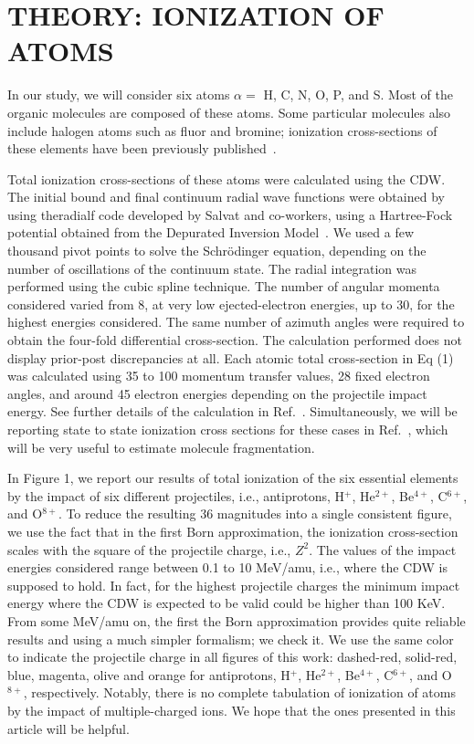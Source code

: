 \documentclass[preprint,showpacs,pra]{revtex4-1}
\begin{document}
\section{THEORY: IONIZATION OF ATOMS}

In our study, we will consider six atoms $\alpha=$ H, C, N, O, P, and S. 
Most of the organic molecules are composed of these atoms. Some 
particular molecules also include halogen atoms such as fluor and 
bromine; ionization cross-sections of these elements have been 
previously published~\cite{miraglia2008,miraglia2009}.

Total ionization cross-sections of these atoms were calculated using 
the CDW. The initial bound and final continuum radial wave functions 
were obtained by using the{\sc radialf} code developed by Salvat and 
co-workers, using a Hartree-Fock potential obtained from the 
Depurated Inversion Model~\cite{mendez2016,mendez2018}. 
We used a few thousand pivot points to solve the Schr\"{o}dinger 
equation, depending on the number of oscillations of the continuum 
state. The radial integration was performed using the 
cubic spline technique. The number of angular momenta considered 
varied from 8, at very low ejected-electron energies, up to 30, 
for the highest energies considered. The same number of azimuth 
angles were required to obtain the four-fold differential 
cross-section. The calculation performed does not display prior-post 
discrepancies at all. Each atomic total cross-section in Eq (1) was 
calculated using 35 to 100 momentum transfer values, 28 fixed 
electron angles, and around 45 electron energies depending on the 
projectile impact energy. See further details of the calculation 
in Ref.~\cite{montanari2017}. Simultaneously, we will be reporting 
state to state ionization cross sections for these cases in 
Ref.~\cite{miraglia2019}, which will be very useful to estimate 
molecule fragmentation.

In Figure 1, we report our results of total ionization of the six 
essential elements by the impact of six different projectiles, i.e., 
antiprotons, H$^{+}$, He$^{2+}$, Be$^{4+}$, C$^{6+}$, and O$^{8+}$. 
To reduce the resulting 36 magnitudes into a single consistent 
figure, we use the fact that in the first Born approximation, 
the ionization cross-section scales with the square of the projectile 
charge, i.e., $Z^{2}$. The values of the impact energies considered 
range between 0.1 to 10 MeV/amu, i.e., where the CDW is supposed 
to hold. In fact, for the highest projectile charges the minimum 
impact energy where the CDW is expected to be valid could be 
higher than 100 KeV. From some MeV/amu on, the first the Born 
approximation provides quite reliable results and using a much 
simpler formalism; we check it. We use the same color to indicate 
the projectile charge in all figures of this work: dashed-red, 
solid-red, blue, magenta, olive and orange for antiprotons, 
H$^{+}$, He$^{2+}$, Be$^{4+}$, C$^{6+}$, and O$^{8+}$, respectively. 
Notably, there is no complete tabulation of ionization of atoms by 
the impact of multiple-charged ions. We hope that the ones presented 
in this article will be helpful.
\end{document}
